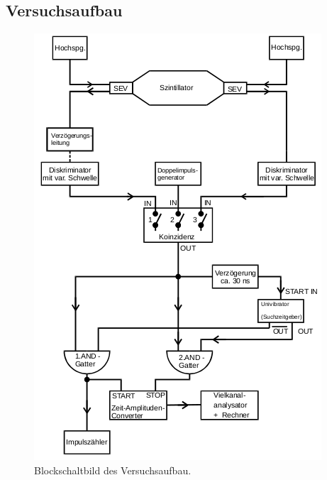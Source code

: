 \subsection{Versuchsaufbau}
\label{sec:Versuchsaufbau}
\begin{figure}
  \centering
  \includegraphics[width=0.9\columnwidth]{pictures/aufbau.png}
  \caption{Blockschaltbild des Versuchsaufbau.\cite{Anleitung}}
  \label{fig:aufbau}
\end{figure}
